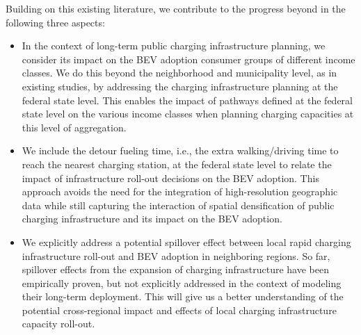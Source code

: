 \documentclass[preprint,review,11pt, authoryear]{elsarticle}
\begin{document}
    
    Building on this existing literature, we contribute to the progress beyond  in the following three aspects:
    \begin{itemize}
        \item In the context of long-term public charging infrastructure planning, we consider its impact on the BEV adoption  consumer groups of different income classes. We do this beyond the neighborhood and municipality level, as in existing studies, by addressing the charging infrastructure planning at the federal state level. This enables  the impact of pathways defined at the federal state level on the various income classes when planning charging capacities at this level of aggregation.
        
        
        \item We include the detour fueling time, i.e., the extra walking/driving time to reach the nearest charging station, at the federal state level to relate the impact of infrastructure roll-out decisions on the BEV adoption. This approach avoids the need for the integration of high-resolution geographic data while still capturing the interaction of spatial densification of public charging infrastructure and its impact on the BEV adoption. 
        
        \item We explicitly address a potential spill\deleted{-}over effect between local rapid charging infrastructure roll-out and BEV adoption in neighboring regions. So far, spill\deleted{-}over effects from the expansion of charging infrastructure have been empirically proven, but not explicitly addressed in the context of modeling their long-term deployment. This will give us a better understanding of the potential cross-regional impact and effects of local charging infrastructure capacity roll-out. 
    \end{itemize}
    
\end{document}
